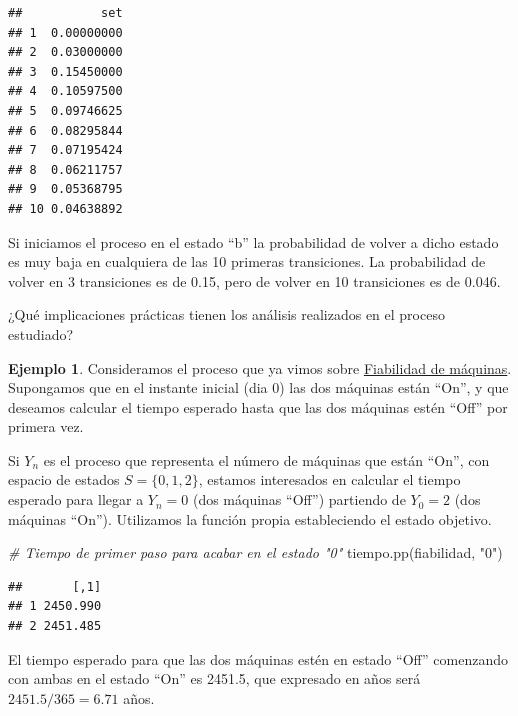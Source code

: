 \documentclass[
]{book}
\newenvironment{Shaded}{\begin{snugshade}}{\end{snugshade}}
\newcommand{\CommentTok}[1]{\textcolor[rgb]{0.56,0.35,0.01}{\textit{#1}}}
\newcommand{\FunctionTok}[1]{\textcolor[rgb]{0.00,0.00,0.00}{#1}}
\newcommand{\NormalTok}[1]{#1}
\newcommand{\StringTok}[1]{\textcolor[rgb]{0.31,0.60,0.02}{#1}}
\theoremstyle{definition}
\theoremstyle{definition}
\newtheorem{example}{Ejemplo}[chapter]
\theoremstyle{definition}
\theoremstyle{definition}
\theoremstyle{remark}
\begin{document}
\begin{verbatim}
##           set
## 1  0.00000000
## 2  0.03000000
## 3  0.15450000
## 4  0.10597500
## 5  0.09746625
## 6  0.08295844
## 7  0.07195424
## 8  0.06211757
## 9  0.05368795
## 10 0.04638892
\end{verbatim}

Si iniciamos el proceso en el estado ``b'' la probabilidad de volver a dicho estado es muy baja en cualquiera de las 10 primeras transiciones. La probabilidad de volver en 3 transiciones es de 0.15, pero de volver en 10 transiciones es de 0.046.

¿Qué implicaciones prácticas tienen los análisis realizados en el proceso estudiado?

\begin{example}
Consideramos el proceso que ya vimos sobre \protect\hyperlink{fiabilidad}{Fiabilidad de máquinas}. Supongamos que en el instante inicial (dia 0) las dos máquinas están ``On'', y que deseamos calcular el tiempo esperado hasta que las dos máquinas estén ``Off'' por primera vez.
\end{example}

Si \(Y_n\) es el proceso que representa el número de máquinas que están ``On'', con espacio de estados \(S = \{0, 1, 2\}\), estamos interesados en calcular el tiempo esperado para llegar a \(Y_n = 0\) (dos máquinas ``Off'') partiendo de \(Y_0 = 2\) (dos máquinas ``On''). Utilizamos la función propia estableciendo el estado objetivo.

\begin{Shaded}
\begin{Highlighting}[]
\CommentTok{\# Tiempo de primer paso para acabar en el estado "0"}
\FunctionTok{tiempo.pp}\NormalTok{(fiabilidad, }\StringTok{"0"}\NormalTok{)}
\end{Highlighting}
\end{Shaded}

\begin{verbatim}
##       [,1]
## 1 2450.990
## 2 2451.485
\end{verbatim}

El tiempo esperado para que las dos máquinas estén en estado ``Off'' comenzando con ambas en el estado ``On'' es 2451.5, que expresado en años será \(2451.5/365 = 6.71\) años.
\end{document}

